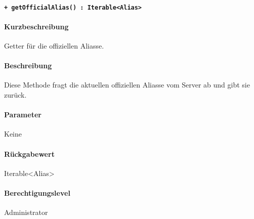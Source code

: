 \paragraph{\texttt{+ getOfficialAlias() : Iterable<Alias>}}%
\paragraph*{Kurzbeschreibung}
Getter für die offiziellen Aliasse.
\paragraph*{Beschreibung}
Diese Methode fragt die aktuellen offiziellen Aliasse vom Server ab und gibt sie zurück.
\paragraph*{Parameter}
Keine
\paragraph*{Rückgabewert}
Iterable<Alias>
\paragraph*{Berechtigungslevel}
Administrator